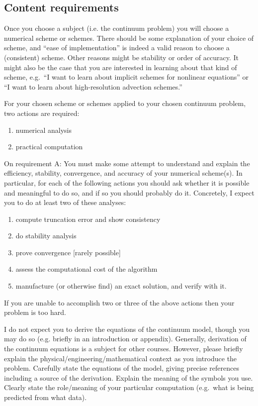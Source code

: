 \documentclass[11pt]{amsart}
\begin{document}
\subsection*{Content requirements}  Once you choose a subject (i.e. the continuum problem) you will choose a numerical scheme or schemes.  There should be some explanation of your choice of scheme, and ``ease of implementation'' is indeed a valid reason to choose a (consistent) scheme.  Other reasons might be stability or order of accuracy.  It might also be the case that you are interested in learning about that kind of scheme, e.g.~``I want to learn about implicit schemes for nonlinear equations'' or ``I want to learn about high-resolution advection schemes.''

For your chosen scheme or schemes applied to your chosen continuum problem, two actions are required:
\renewcommand{\labelenumi}{\Alph{enumi}.}
\begin{enumerate}
\item numerical analysis
\item practical computation
\end{enumerate}

On requirement A: You must make some attempt to understand and explain the efficiency, stability, convergence, and accuracy of your numerical scheme(s).  In particular, for each of the following actions you should ask whether it is possible and meaningful to do so, and if so you should probably do it.  Concretely, I expect you to do at least two of these analyses:
\renewcommand{\labelenumi}{\roman{enumi}.}
\begin{enumerate}
\item compute truncation error and show consistency
\item do stability analysis
\item prove convergence [rarely possible]
\item assess the computational cost of the algorithm
\item manufacture (or otherwise find) an exact solution, and verify with it.
\end{enumerate}
If you are unable to accomplish two or three of the above actions then your problem is too hard.

I do not expect you to derive the equations of the continuum model, though you may do so (e.g. briefly in an introduction or appendix).  Generally, derivation of the continuum equations is a subject for other courses.  However, please briefly explain the physical/engineering/mathematical context as you introduce the problem.  Carefully state the equations of the model, giving precise references including a source of the derivation.  Explain the meaning of the symbols you use.  Clearly state the role/meaning of your particular computation (e.g.~what is being predicted from what data).
\end{document}
